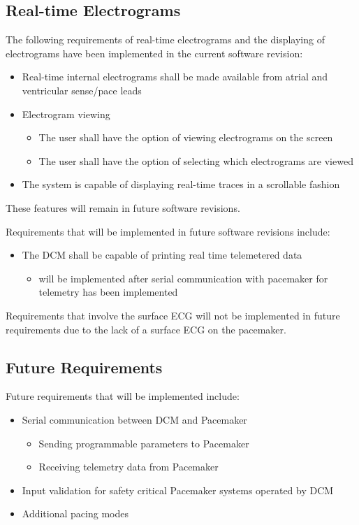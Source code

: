 \documentclass[12pt]{article}
\begin{document}
\subsection{Real-time Electrograms}
The following requirements of real-time electrograms and the displaying of electrograms have been implemented in the current software revision:
\begin{itemize}
    \item Real-time internal electrograms shall be made available from atrial and ventricular sense/pace leads
    \item Electrogram viewing
    \begin{itemize}
        \item The user shall have the option of viewing electrograms on the screen
        \item The user shall have the option of selecting which electrograms are viewed
    \end{itemize}
    \item The system is capable of displaying real-time traces in a scrollable fashion
\end{itemize}
These features will remain in future software revisions.

Requirements that will be implemented in future software revisions include:
\begin{itemize}
    \item The DCM shall be capable of printing real time telemetered data
    \begin{itemize}
        \item will be implemented after serial communication with pacemaker for telemetry has been implemented
    \end{itemize}
\end{itemize}

Requirements that involve the surface ECG will not be implemented in future requirements due to the lack of a surface ECG on the pacemaker.

\subsection{Future Requirements}
Future requirements that will be implemented include:
\begin{itemize}
    \item Serial communication between DCM and Pacemaker
    \begin{itemize}
        \item Sending programmable parameters to Pacemaker
        \item Receiving telemetry data from Pacemaker
    \end{itemize}
    \item Input validation for safety critical Pacemaker systems operated by DCM
    \item Additional pacing modes
\end{itemize}
\end{document}
